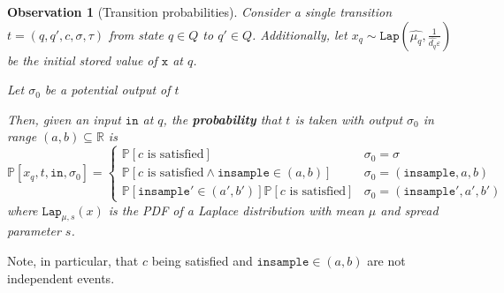\documentclass[12pt]{article}
\newcommand{\RR}{\mathbb{R}}
\newcommand{\PP}{\mathbb{P}}
\newcommand{\Lap}{\texttt{Lap}}
\newtheorem{obs}[thm]{Observation}
\theoremstyle{definition}
\begin{document}
\begin{obs}[Transition probabilities]
    Consider a single transition $t=(q, q', c, \sigma, \tau)$ from state $q\in Q$ to $q'\in Q$. Additionally, let $x_q\sim \Lap(\hat{\mu_q}, \frac{1}{\hat{d_q}\varepsilon})$ be the initial stored value of $\texttt{x}$ at $q$. 

    Let $\sigma_0$ be a \textit{potential} output of $t$
    
    Then, given an input $\texttt{in}$ at $q$, the \textbf{probability} that $t$ is taken with output $\sigma_0$ in range $(a, b)\subseteq \RR$ is \[
        \PP[x_q, t, \texttt{in}, \sigma_0] = \begin{cases}
            \PP[c\text{ is satisfied}] & \sigma_0 =\sigma \\
            \PP[c\text{ is satisfied}\land \texttt{insample}\in(a, b)] & \sigma_0 = (\texttt{insample}, a, b)\\
            \PP[\texttt{insample}'\in (a', b')]\PP[c\text{ is satisfied}]& \sigma_0 = (\texttt{insample}', a', b')
        \end{cases}
    \]
    where $\Lap_{\mu, s}(x)$ is the PDF of a Laplace distribution with mean $\mu$ and spread parameter $s$.
\end{obs}

Note, in particular, that $c$ being satisfied and $\texttt{insample}\in (a, b)$ are not independent events.

\end{document}

